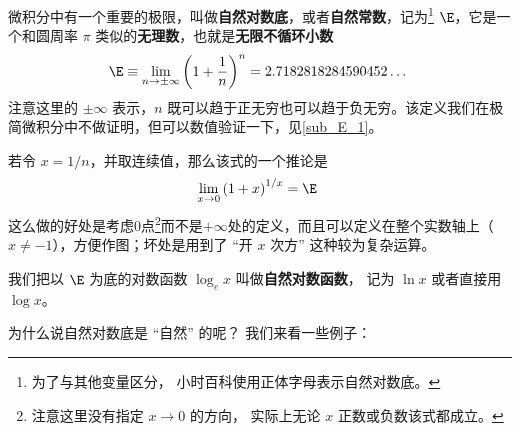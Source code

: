 
微积分中有一个重要的极限，叫做\textbf{自然对数底}，或者\textbf{自然常数}，记为\footnote{为了与其他变量区分， 小时百科使用正体字母表示自然对数底。} $\E$，它是一个和圆周率 $\pi$ 类似的\textbf{无理数}，也就是\textbf{无限不循环小数}
\begin{equation}\label{eq_E_1}
\E \equiv \lim_{n \to \pm\infty} \left(1 + \frac{1}{n}\right)^n = 2.7182818284590452\dots~
\end{equation}
注意这里的 $\pm\infty$ 表示，$n$ 既可以趋于正无穷也可以趋于负无穷。该定义我们在极简微积分中不做证明，但可以数值验证一下，见\autoref{sub_E_1}。

若令 $x = 1/n$，并取连续值，那么该式的一个推论是
\begin{equation}\label{eq_E_5}
\lim_{x \to 0} \left(1 + x\right)^{1/x} = \E~
\end{equation}
这么做的好处是考虑$0$点\footnote{注意这里没有指定 $x\to 0$ 的方向， 实际上无论 $x$ 正数或负数该式都成立。}而不是$+\infty$处的定义，而且可以定义在整个实数轴上（$x \neq -1$），方便作图；坏处是用到了 “开 $x$ 次方” 这种较为复杂运算。

我们把以 $\E$ 为底的对数函数 $\log_e x$ 叫做\textbf{自然对数函数}， 记为 $\ln x$ 或者直接用 $\log x$。 %

为什么说自然对数底是 “自然” 的呢？ 我们来看一些例子：

